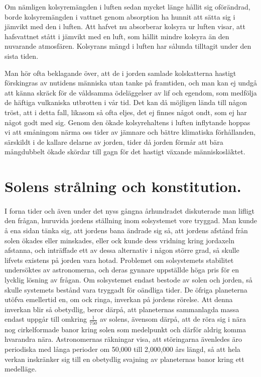 \documentclass[a4paper, 12pt, oneside, swedish]{article}
\begin{document}
Om nämligen kolsyremängden i luften sedan mycket länge hållit sig oförändrad, borde kolsyremängden i vattnet genom absorption ha hunnit att sätta sig i jämvikt med den i luften. Att hafvet nu absorberar kolsyra ur luften visar, att hafsvattnet stått i jämvikt med en luft, som hållit mindre kolsyra än den nuvarande atmosfären. Kolsyrans mängd i luften har sålunda tilltagit under den sista tiden.

Man hör ofta beklagande över, att de i jorden samlade kolskatterna hastigt förskingras av nutidens människa utan tanke på framtiden, och man kan ej undgå att känna skräck för de våldsamma ödeläggelser av lif och egendom, som medfölja de häftiga vulkaniska utbrotten i vår tid. Det kan då möjligen lända till någon tröst, att i detta fall, likasom så ofta eljes, det ej finnes något ondt, som ej har något godt med sig. Genom den ökade kolsyrehaltens i luften inflytande hoppas vi att småningom närma oss tider av jämnare och bättre klimatiska förhållanden, särskildt i de kallare delarne av jorden, tider då jorden förmår att bära mångdubbelt ökade skördar till gagn för det hastigt växande människosläktet.
\clearpage
\section{Solens strålning och konstitution.}
\paragraph{}
I forna tider och även under det nyss gångna århundradet diskuterade man lifligt den frågan, huruvida jordens ställning inom solsystemet vore tryggad. Man kunde å ena sidan tänka sig, att jordens bana ändrade sig så, att jordens afstånd från solen ökades eller minskades, eller ock kunde dess vridning kring jordaxeln afstanna, och inträffade ett av dessa alternativ i någon större grad, så skulle lifvets existens på jorden vara hotad. Problemet om solsystemets stabilitet undersöktes av astronomerna, och deras gynnare uppställde höga pris för en lycklig lösning av frågan. Om solsystemet endast bestode av solen och jorden, så skulle systemets bestånd vara tryggadt för oändliga tider. De öfriga planeterna utöfva emellertid en, om ock ringa, inverkan på jordens rörelse. Att denna inverkan blir så obetydlig, beror därpå, att planeternas sammanlagda massa endast uppgår till omkring $\frac{1}{750}$ av solens, ävensom därpå, att de röra sig i nära nog cirkelformade banor kring solen som medelpunkt och därför aldrig komma hvarandra nära. Astronomernas räkningar visa, att störingarna ävenledes äro periodiska med långa perioder om 50,000 till 2,000,000 års längd, så att hela verkan inskränker sig till en obetydlig svajning av planeternas banor kring ett medelläge.
\end{document}
